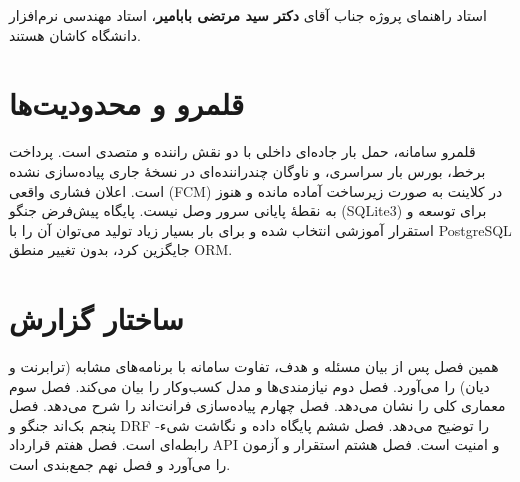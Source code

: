 استاد راهنمای پروژه جناب آقای \textbf{دکتر سید مرتضی بابامیر}، استاد مهندسی نرم‌افزار دانشگاه کاشان هستند.

\section{قلمرو و محدودیت‌ها}

قلمرو سامانه، حمل بار جاده‌ای داخلی با دو نقش راننده و متصدی است. پرداخت برخط، بورس بار سراسری، و ناوگان چندراننده‌ای در نسخهٔ جاری پیاده‌سازی نشده است. اعلان فشاری واقعی (\textenglish{FCM}) در کلاینت به صورت زیرساخت آماده مانده و هنوز به نقطهٔ پایانی سرور وصل نیست. پایگاه پیش‌فرض جنگو (\textenglish{SQLite3}) برای توسعه و استقرار آموزشی انتخاب شده و برای بار بسیار زیاد تولید می‌توان آن را با \textenglish{PostgreSQL} جایگزین کرد، بدون تغییر منطق \textenglish{ORM}.

\section{ساختار گزارش}

همین فصل پس از بیان مسئله و هدف، تفاوت سامانه با برنامه‌های مشابه (ترابرنت و دیان) را می‌آورد. فصل دوم نیازمندی‌ها و مدل کسب‌وکار را بیان می‌کند. فصل سوم معماری کلی را نشان می‌دهد. فصل چهارم پیاده‌سازی فرانت‌اند را شرح می‌دهد. فصل پنجم بک‌اند جنگو و \textenglish{DRF} را توضیح می‌دهد. فصل ششم پایگاه داده و نگاشت شیء-رابطه‌ای است. فصل هفتم قرارداد \textenglish{API} و امنیت است. فصل هشتم استقرار و آزمون را می‌آورد و فصل نهم جمع‌بندی است.
